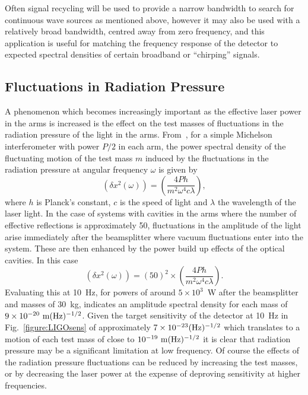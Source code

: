 \documentclass{article}
\begin{document}
Often signal recycling will be used to provide a narrow bandwidth to
search for continuous wave sources as mentioned above, however it may
also be used with a relatively broad bandwidth, centred away from
zero frequency, and this application is useful for matching the
frequency response of the detector to expected spectral densities of
certain broadband or ``chirping'' signals.


\subsection{Fluctuations in Radiation Pressure}
\label{subsection:radpress}

A phenomenon which becomes increasingly important as the effective
laser power in the arms is increased is the effect on the test masses
of fluctuations in the radiation pressure of the light in the
arms. From~\cite{Edelstein}, for a simple Michelson interferometer
with power $P/2$ in each arm, the power spectral density of the
fluctuating motion of the test mass $m$ induced by the fluctuations in
the radiation pressure at angular frequency $\omega$ is given by
%
\begin{equation}
  (\delta x^2(\omega)) = \left(\frac{4Ph}{m^2 \omega^{4} c
  \lambda}\right),
  \label{equation:radiation1}
\end{equation}
%
where $h$ is Planck's constant, $c$ is the speed of light and
$\lambda$ the wavelength of the laser light. In the case of systems
with cavities in the arms where the number of effective reflections is
approximately 50, fluctuations in the amplitude of the light arise
immediately after the beamsplitter where vacuum fluctuations enter
into the system. These are then enhanced by the power build up effects
of the optical cavities. In this case
%
\begin{equation}
  (\delta x^2(\omega)) = (50)^2 \times \left(\frac{4Ph}{m^2 \omega^{4} c
  \lambda}\right).
  \label{equation:radiation2}
\end{equation}
%
Evaluating this at 10~Hz, for powers of around $5 \times 10^3$~W
after the beamsplitter and masses of 30~kg, indicates an amplitude
spectral density for each mass of $9 \times 10^{-20} {\rm
\ m}(\rm Hz)^{-1/2}$. Given the target sensitivity of the detector at
10~Hz in Fig.~\ref{figure:LIGOsens} of approximately $7 \times
10^{-23}(\rm Hz)^{-1/2}$ which translates to a motion of each test mass
of close to $10^{-19} {\rm \ m}(\rm Hz)^{-1/2}$ it is clear that
radiation pressure may be a significant limitation at low
frequency. Of course the effects of the radiation pressure
fluctuations can be reduced by increasing the test masses, or by
decreasing the laser power at the expense of deproving sensitivity at
higher frequencies.
\end{document}
